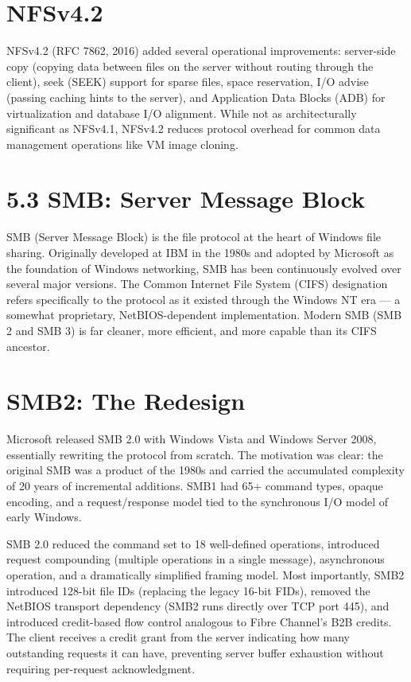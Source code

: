 \section{NFSv4.2}
NFSv4.2 (RFC 7862, 2016) added several operational improvements: server-side copy (copying data between files on the server without routing through the client), seek (SEEK) support for sparse files, space reservation, I/O advise (passing caching hints to the server), and Application Data Blocks (ADB) for virtualization and database I/O alignment. While not as architecturally significant as NFSv4.1, NFSv4.2 reduces protocol overhead for common data management operations like VM image cloning.

\section{5.3 SMB: Server Message Block}
SMB (Server Message Block) is the file protocol at the heart of Windows file sharing. Originally developed at IBM in the 1980s and adopted by Microsoft as the foundation of Windows networking, SMB has been continuously evolved over several major versions. The Common Internet File System (CIFS) designation refers specifically to the protocol as it existed through the Windows NT era --- a somewhat proprietary, NetBIOS-dependent implementation. Modern SMB (SMB 2 and SMB 3) is far cleaner, more efficient, and more capable than its CIFS ancestor.

\section{SMB2: The Redesign}
Microsoft released SMB 2.0 with Windows Vista and Windows Server 2008, essentially rewriting the protocol from scratch. The motivation was clear: the original SMB was a product of the 1980s and carried the accumulated complexity of 20 years of incremental additions. SMB1 had 65+ command types, opaque encoding, and a request/response model tied to the synchronous I/O model of early Windows.

SMB 2.0 reduced the command set to 18 well-defined operations, introduced request compounding (multiple operations in a single message), asynchronous operation, and a dramatically simplified framing model. Most importantly, SMB2 introduced 128-bit file IDs (replacing the legacy 16-bit FIDs), removed the NetBIOS transport dependency (SMB2 runs directly over TCP port 445), and introduced credit-based flow control analogous to Fibre Channel's B2B credits. The client receives a credit grant from the server indicating how many outstanding requests it can have, preventing server buffer exhaustion without requiring per-request acknowledgment.

